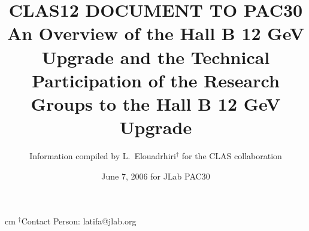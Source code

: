 \title{{\small CLAS12 DOCUMENT TO PAC30} \\
An Overview of the Hall B 12 GeV Upgrade
and the Technical Participation of the Research Groups to the Hall B 12 GeV Upgrade
}

\bigskip
\date{June 7, 2006 for JLab PAC30}
\author{ Information compiled by L.~Elouadrhiri$^{\dagger}$ for the CLAS collaboration}



\maketitle
{} cm
{$^\dagger$Contact Person: latifa@jlab.org }

\newpage
